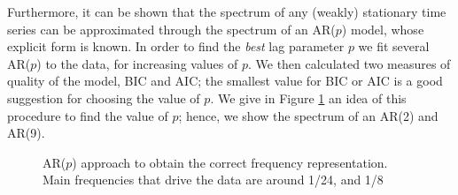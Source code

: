 \documentclass[]{article}
\begin{document}
\vspace{0.1cm}
Furthermore, it can be shown that the spectrum of any (weakly) stationary time series can be approximated through the spectrum of an AR($p$) model, whose explicit form is known. In order to find the \textit{best} lag parameter $p$ we fit several AR($p$) to the data, for increasing values of $p$. We then calculated two measures of quality of the model, BIC and AIC; the smallest value for BIC or AIC is a good suggestion for choosing the value of $p$. We give in Figure \ref{fig:spectrums_Temp8} an idea of this procedure to find the value of $p$; hence, we show the spectrum of an AR(2) and AR(9). 

\begin{figure}[htbp]
	\centering
	\hfill
	\caption{AR($p$) approach to obtain the correct frequency representation. Main frequencies that drive the data are around 1/24, and 1/8}
	\label{fig:spectrums_Temp8}
\end{figure}
\end{document}
